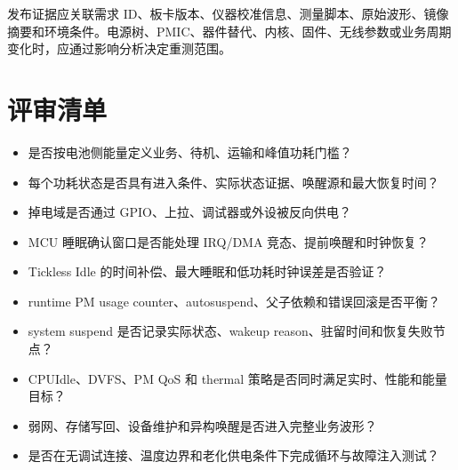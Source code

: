 发布证据应关联需求 ID、板卡版本、仪器校准信息、测量脚本、原始波形、镜像摘要和环境条件。电源树、PMIC、器件替代、内核、固件、无线参数或业务周期变化时，应通过影响分析决定重测范围。

\section{评审清单}

\begin{itemize}
  \item 是否按电池侧能量定义业务、待机、运输和峰值功耗门槛？
  \item 每个功耗状态是否具有进入条件、实际状态证据、唤醒源和最大恢复时间？
  \item 掉电域是否通过 GPIO、上拉、调试器或外设被反向供电？
  \item MCU 睡眠确认窗口是否能处理 IRQ/DMA 竞态、提前唤醒和时钟恢复？
  \item Tickless Idle 的时间补偿、最大睡眠和低功耗时钟误差是否验证？
  \item runtime PM usage counter、autosuspend、父子依赖和错误回滚是否平衡？
  \item system suspend 是否记录实际状态、wakeup reason、驻留时间和恢复失败节点？
  \item CPUIdle、DVFS、PM QoS 和 thermal 策略是否同时满足实时、性能和能量目标？
  \item 弱网、存储写回、设备维护和异构唤醒是否进入完整业务波形？
  \item 是否在无调试连接、温度边界和老化供电条件下完成循环与故障注入测试？
\end{itemize}
